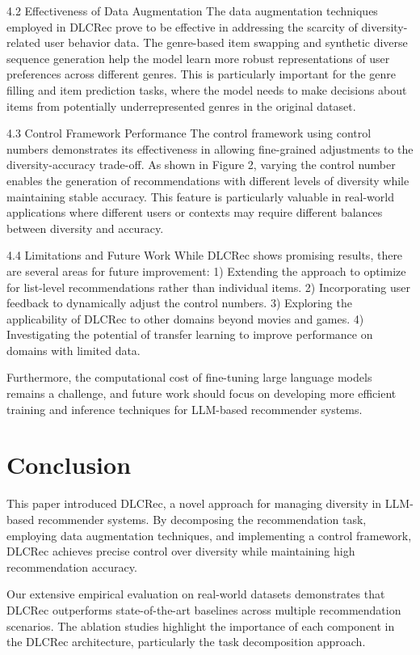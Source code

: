 \documentclass[12pt,letterpaper]{article}
\begin{document}
4.2 Effectiveness of Data Augmentation
The data augmentation techniques employed in DLCRec prove to be effective in addressing the scarcity of diversity-related user behavior data. The genre-based item swapping and synthetic diverse sequence generation help the model learn more robust representations of user preferences across different genres. This is particularly important for the genre filling and item prediction tasks, where the model needs to make decisions about items from potentially underrepresented genres in the original dataset.

4.3 Control Framework Performance
The control framework using control numbers demonstrates its effectiveness in allowing fine-grained adjustments to the diversity-accuracy trade-off. As shown in Figure 2, varying the control number enables the generation of recommendations with different levels of diversity while maintaining stable accuracy. This feature is particularly valuable in real-world applications where different users or contexts may require different balances between diversity and accuracy.

4.4 Limitations and Future Work
While DLCRec shows promising results, there are several areas for future improvement:
1) Extending the approach to optimize for list-level recommendations rather than individual items.
2) Incorporating user feedback to dynamically adjust the control numbers.
3) Exploring the applicability of DLCRec to other domains beyond movies and games.
4) Investigating the potential of transfer learning to improve performance on domains with limited data.

Furthermore, the computational cost of fine-tuning large language models remains a challenge, and future work should focus on developing more efficient training and inference techniques for LLM-based recommender systems.

\section{Conclusion}

This paper introduced DLCRec, a novel approach for managing diversity in LLM-based recommender systems. By decomposing the recommendation task, employing data augmentation techniques, and implementing a control framework, DLCRec achieves precise control over diversity while maintaining high recommendation accuracy.

Our extensive empirical evaluation on real-world datasets demonstrates that DLCRec outperforms state-of-the-art baselines across multiple recommendation scenarios. The ablation studies highlight the importance of each component in the DLCRec architecture, particularly the task decomposition approach.
\end{document}
